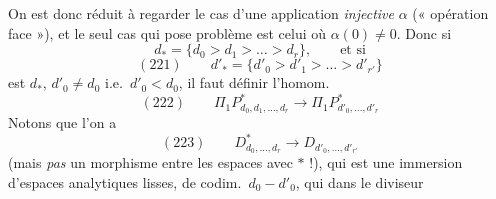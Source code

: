 \documentclass[11pt,a4paper]{article}
\begin{document}
On est donc réduit à regarder le cas d'une application \emph{injective} $\alpha$
(« opération face »), et le seul cas qui pose problème est celui où
$\alpha(0) \neq 0$. Donc si
\[
  d_{*} = \{d_0 > d_1 > \dots > d_r\}, \qquad \text{et si}
\]
\[
  (221) \qquad d'_{*} = \{d'_0 > d'_1 > \dots > d'_{r'}\}
\]
est \struck{\ill{}}  $d_{*}$,
$d'_0 \neq d_0$ i.e.\ $d'_0 < d_0$, il faut définir l'homom.
\[
  (222) \qquad \Pi_1 P^{*}_{d_0,d_1,\dots,d_r} \longrightarrow \Pi_1 P^{*}_{d'_0,\dots,d'_r}
\]
Notons que l'on a
\[
  (223) \qquad D^{*}_{d_0,\dots,d_r} \longrightarrow D_{d'_0,\dots,d'_{r'}}
\]
(mais \emph{pas} un morphisme entre les espaces avec $*$ !), qui est une
immersion  d'espaces analytiques lisses, de codim.\ $d_0 - d'_0$,
qui  \ill{} dans le diviseur


\end{document}
